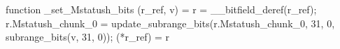 function _set_Mstatush_bits (r_ref, v) = {
    r = __bitfield_deref(r_ref);
    r.Mstatush_chunk_0 = update_subrange_bits(r.Mstatush_chunk_0, 31, 0, subrange_bits(v, 31, 0));
    (*r_ref) = r
}
